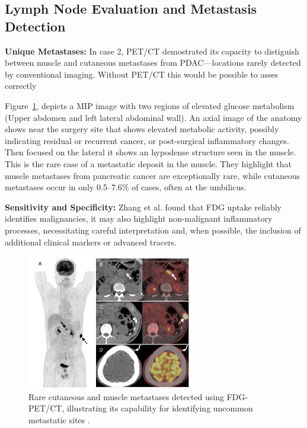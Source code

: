 \begin{multicols}{2}


\subsection{Lymph Node Evaluation and Metastasis Detection}

\textbf{Unique Metastases:} 
In case 2, PET/CT demostrated its capacity to distiguish between muscle and cutaneous metastases from PDAC—locations rarely detected by conventional imaging. Without PET/CT this would be possible to asses correctly

Figure~\ref{fig:Zhang1}, depicts a MIP image with two regions of elevated glucose metabolism (Upper abdomen and left lateral abdominal wall). An axial image of the anatomy shows near the surgery site that shows elevated metabolic activity, possibly indicating residual or recurrent cancer, or post-surgical inflammatory changes. Then focused on the lateral it shows an hypodense structure seen in the muscle. This is the rare case of a metastatic deposit in the muscle. They highlight that muscle metastases from pancreatic cancer are exceptionally rare, while cutaneous metastases occur in only 0.5–7.6\% of cases, often at the umbilicus\cite{Zhang2023}.


\textbf{Sensitivity and Specificity:} Zhang et al. found that FDG uptake reliably identifies malignancies, it may also highlight non-malignant inflammatory processes, necessitating careful interpretation and, when possible, the inclusion of additional clinical markers or advanced tracers.


\end{multicols}

\begin{figure}[ht]
	\centering
	\includegraphics[width=0.65\textwidth]{assets/Zhang1.png}
	\caption{Rare cutaneous and muscle metastases detected using FDG-PET/CT, illustrating its capability for identifying uncommon metastatic sites \cite{Zhang2023}.}
	\label{fig:Zhang1}
\end{figure}

